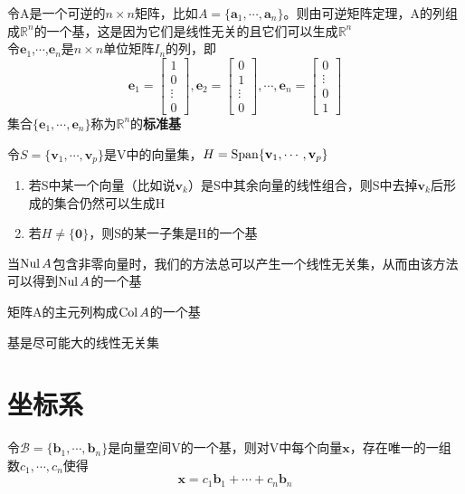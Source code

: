 令A是一个可逆的$n\times n$矩阵，比如$A=\{\mathbf{a}_1,\cdots,\mathbf{a}_n\}$。则由可逆矩阵定理，A的列组成$\mathbb{R}^n$的一个基，这是因为它们是线性无关的且它们可以生成$\mathbb{R}^n$\\[2ex]

令$\mathbf{e}_1$,$\cdots$,$\mathbf{e}_n$是$n\times n$单位矩阵$I_n$的列，即
\[\mathbf{e}_1=\left[
\begin{array}{c}
1\\
0\\
\vdots\\
0
\end{array}
\right],\mathbf{e}_2=\left[
\begin{array}{c}
0\\
1\\
\vdots\\
0
\end{array}
\right],\cdots,\mathbf{e}_n=\left[
\begin{array}{c}
0\\
\vdots\\
0\\
1
\end{array}
\right]\]
集合$\{\mathbf{e}_1,\cdots,\mathbf{e}_n\}$称为$\mathbb{R}^n$的\textbf{标准基}\\[2ex]

\begin{TheoremTwo}[生成集定理]
令$S=\{\mathbf{v}_1,\cdots,\mathbf{v}_p\}$是V中的向量集，$H=\operatorname{Span}\{\mathbf{v}_1,\cdots,\mathbf{v}_p\}$
\begin{enumerate}
\item 若S中某一个向量（比如说$\mathbf{v}_k$）是S中其余向量的线性组合，则S中去掉$\mathbf{v}_k$后形成的集合仍然可以生成H
\item 若$H\neq\{\mathbf{0}\}$，则S的某一子集是H的一个基
\end{enumerate}
\end{TheoremTwo}\vspace{4ex}

当$\operatorname{Nul} A$包含非零向量时，我们的方法总可以产生一个线性无关集，从而由该方法可以得到$\operatorname{Nul} A$的一个基\\[2ex]

\begin{TheoremOne}
矩阵A的主元列构成$\operatorname{Col} A$的一个基
\end{TheoremOne}\vspace{4ex}

基是尽可能大的线性无关集

\section{坐标系}
\begin{TheoremTwo}[唯一表示定理]
令$\mathcal{B}=\{\mathbf{b}_1,\cdots,\mathbf{b}_n\}$是向量空间V的一个基，则对V中每个向量$\bm{x}$，存在唯一的一组数$c_1,\cdots,c_n$使得
\[\bm{x}=c_1\bm{b}_1+\cdots+c_n\bm{b}_n\]
\end{TheoremTwo}\vspace{4ex}


